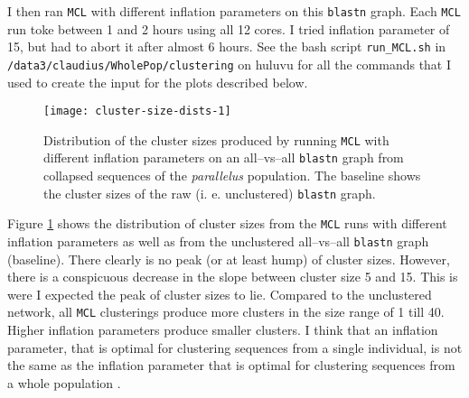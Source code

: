 \documentclass{article}\usepackage[]{graphicx}\usepackage[]{color}
\begin{document}
I then ran \texttt{MCL} with different inflation parameters on this \texttt{blastn} graph. Each \texttt{MCL} run toke between 1 and 2 hours using all 12 cores. I tried inflation parameter of 15, but had to abort it after almost 6 hours. See the bash script \texttt{run\_MCL.sh} in \texttt{/data3/claudius/WholePop/clustering} on huluvu for all the commands that I used to create the input for the plots described below. 
\begin{figure}
\centering
\texttt{[image: cluster-size-dists-1]}
\caption{Distribution of the cluster sizes produced by running \texttt{MCL} with different inflation parameters on an all--vs--all \texttt{blastn} graph from collapsed sequences of the \textit{parallelus} population. The baseline shows the cluster sizes of the raw (i. e. unclustered) \texttt{blastn} graph.}
\label{Fig:cluster-size-dists-1}
\end{figure}
Figure \ref{Fig:cluster-size-dists-1} shows the distribution of cluster sizes from the \texttt{MCL} runs with different inflation parameters as well as from the unclustered all--vs--all \texttt{blastn} graph (baseline). There clearly is no peak (or at least hump) of cluster sizes. However, there is a conspicuous decrease in the slope between cluster size 5 and 15. This is were I expected the peak of cluster sizes to lie. Compared to the unclustered network, all \texttt{MCL} clusterings produce more clusters in the size range of 1 till 40. Higher inflation parameters produce smaller clusters. I think that an inflation parameter, that is optimal for clustering sequences from a single individual, is not the same as the inflation parameter that is optimal for clustering sequences from a whole population \citep{vanDongen2012}. %
\end{document}
